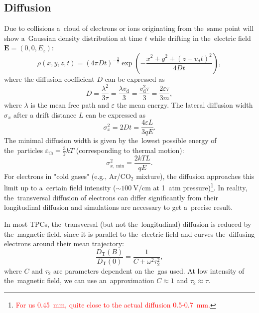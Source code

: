		\subsection{Diffusion}
			Due to collisions a~cloud of electrons or ions originating from the~same point will show a~Gaussian density distribution at time $t$ while drifting in the~electric field $\mathbf{E} = (0,0,E_z)$:
				\begin{equation}
					\rho(x,y,z,t) = (4\pi Dt)^{-\frac{3}{2}} \exp\left(-\frac{x^2+y^2+(z-v_dt)^2}{4Dt}\right),
				\end{equation}
			where the diffusion coefficient $D$ can be expressed as
				\begin{equation}
					D = \frac{\lambda^2}{3\tau} = \frac{\lambda v_\text{d}}{3} = \frac{v_\text{d}^2\tau}{3} = \frac{2\varepsilon\tau}{3m},
				\end{equation}
			where $\lambda$ is the mean free path and $\varepsilon$ the mean energy. The lateral diffusion width $\sigma_x$ after a drift distance $L$ can be expressed as
				\begin{equation}
					\sigma_x^2 = 2Dt = \frac{4\varepsilon L}{3qE}.
				\end{equation}
			The minimal diffusion width is given by the~lowest possible energy of the~particles $\varepsilon_\text{th} = \frac{3}{2}kT$ (corresponding to thermal motion):
				\begin{equation}
					\sigma_{x, \,\text{min}}^2 = \frac{2kTL}{qE}.
				\end{equation}
			For electrons in "cold gases" (e.g., Ar/CO$_2$ mixture), the diffusion approaches this limit up to a~certain field intensity ($\sim 100~\text{V}/\text{cm}$ at 1~atm pressure)\footnote{\textcolor{red}{For us 0.45~mm, quite close to the actual diffusion 0.5-0.7~mm.}}. In reality, the~transversal diffusion of electrons can differ significantly from their longitudinal diffusion and simulations are necessary to get a~precise result.
			
			In most \ac{TPC}s, the~transversal (but not the~longitudinal) diffusion is reduced by the~magnetic field, since it is parallel to the~electric field and curves the~diffusing electrons around their mean trajectory:
				\begin{equation}
					\label{eq:difmag}
					\frac{D_\text{T}(B)}{D_\text{T}(0)} = \frac{1}{C+\omega^2\tau_2^2},
				\end{equation}
			where $C$ and $\tau_2$ are parameters dependent on the~gas used. At low intensity of the~magnetic field, we can use an~approximation $C\approx1$ and $\tau_2\approx\tau$.
	
